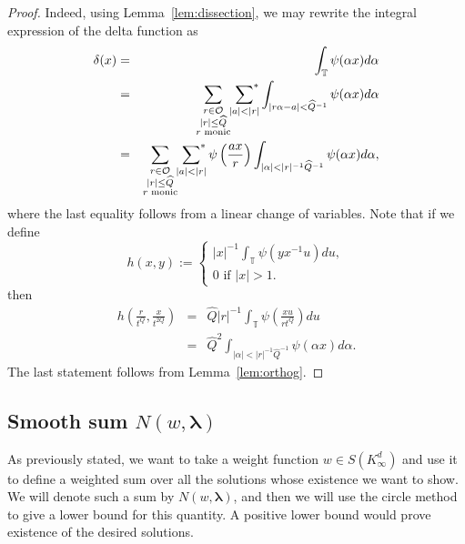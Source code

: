 \documentclass[11pt]{amsart}
\theoremstyle{plain}
\theoremstyle{plain}
\theoremstyle{remark}
\theoremstyle{definition}
\renewcommand{\hat}{\widehat}
\newcommand{\TT}{\mathbb{T}}
\newcommand{\sumstar}{\sideset{}{^*}\sum}
\newcommand{\cO}{\mathcal{O}}
\begin{document}
\begin{proof}
Indeed, using Lemma~\ref{lem:dissection}, we may rewrite the integral expression of the delta function as
\begin{eqnarray*}
\delta(x)&=&\int_{\TT}\psi(\alpha x)d\alpha\\
&=& \sum_{\substack{r\in \cO\\
|r|\leq \hat Q\\
\text{$r$ monic}
} }
\sumstar_{\substack{
|a|<|r|} }\int_{|r\alpha-a|<\hat Q^{-1}}\psi(\alpha x)d\alpha\\ &=& \sum_{\substack{r\in \cO\\
|r|\leq \hat Q\\
\text{$r$ monic}
} }
\sumstar_{\substack{
|a|<|r|} }\psi\left(\frac{ax}{r}\right)\int_{|\alpha|<|r|^{-1}\hat Q^{-1}}\psi(\alpha x)d\alpha,
\end{eqnarray*}
where the last equality follows from a linear change of variables. Note that if we define
\[
h(x,y):=\begin{cases}
|x|^{-1}\int_{\TT}\psi(y x^{-1} u) du,
\\
0 \text{ if } |x|>1.
\end{cases}
\]
then
\begin{eqnarray*}
h\left(\frac{r}{t^Q},\frac{x}{t^{2Q}}\right)&=& \hat{Q}|r|^{-1}\int_{\TT}\psi\left(\frac{xu}{rt^Q}\right)du\\
&=&\hat{Q}^2\int_{|\alpha|<|r|^{-1}\hat{Q}^{-1}}\psi(\alpha x)d\alpha.
\end{eqnarray*}
The last statement follows from Lemma~\ref{lem:orthog}.
\end{proof}
\subsection{Smooth sum $N(w,\boldsymbol{\lambda})$}
As previously stated, we want to take a weight function $w\in S(K_{\infty}^d)$ and use it to define a weighted sum over all the solutions whose existence we want to show. We will denote such a sum by $N(w,\boldsymbol{\lambda})$, and then we will use the circle method to give a lower bound for this quantity. A positive lower bound would prove existence of the desired solutions.\\
\\
\end{document}
